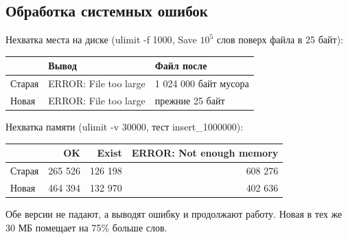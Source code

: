 \subsection{Обработка системных ошибок}
Нехватка места на диске ({\ttfamily ulimit -f 1000}, Save $10^5$ слов поверх файла в 25 байт):
\begin{longtable}{|l|l|l|}
\hline
\rowcolor{lightgray}
 & Вывод & Файл после\\
\hline
Старая & {\ttfamily ERROR: File too large} & 1 024 000 байт мусора\\
Новая & {\ttfamily ERROR: File too large} & прежние 25 байт\\
\hline
\end{longtable}

Нехватка памяти ({\ttfamily ulimit -v 30000}, тест {\ttfamily insert\_1000000}):
\begin{longtable}{|l|r|r|r|}
\hline
\rowcolor{lightgray}
 & {\ttfamily OK} & {\ttfamily Exist} & {\ttfamily ERROR: Not enough memory}\\
\hline
Старая & 265 526 & 126 198 & 608 276\\
Новая & 464 394 & 132 970 & 402 636\\
\hline
\end{longtable}
Обе версии не падают, а выводят ошибку и продолжают работу. Новая в тех же 30 МБ помещает
на 75\% больше слов.
\pagebreak
